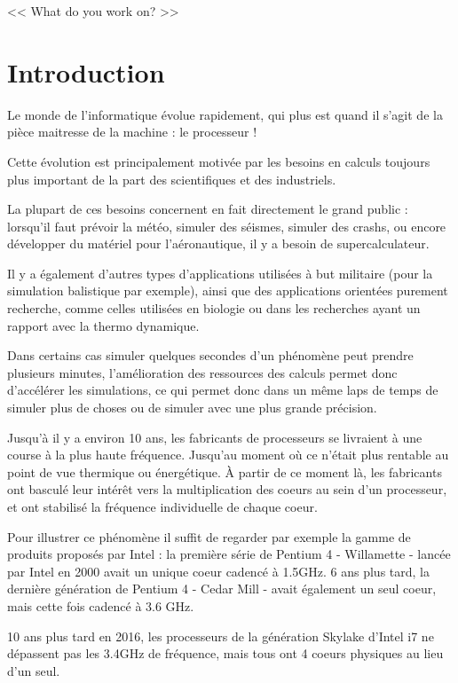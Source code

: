 \begin{savequote}[6cm]
<< What do you work on?  >>
\end{savequote}
\chapter{Introduction}
\chaptertoc

Le monde de l'informatique évolue rapidement, qui plus est quand il s'agit de la pièce maitresse de la machine : le processeur !

Cette évolution est principalement motivée par les besoins en calculs toujours plus important de la part des scientifiques et des industriels.

La plupart de ces besoins concernent en fait directement le grand public : lorsqu'il faut prévoir la météo, simuler des séismes, simuler des crashs, ou encore développer du matériel pour l'aéronautique, il y a besoin de supercalculateur.

Il y a également d'autres types d'applications utilisées à but militaire (pour la simulation balistique par exemple), ainsi que des applications orientées purement recherche, comme celles utilisées en biologie ou dans les recherches ayant un rapport avec la thermo dynamique.

Dans certains cas simuler quelques secondes d'un phénomène peut prendre plusieurs minutes, l'amélioration des ressources des calculs permet donc d'accélérer les simulations, ce qui permet donc dans un même laps de temps de simuler plus de choses ou de simuler avec une plus grande précision.

Jusqu'à il y a environ 10 ans, les fabricants de processeurs se livraient à une course à la plus haute fréquence.
Jusqu'au moment où ce n'était plus rentable au point de vue thermique ou énergétique. À partir de ce moment là, les fabricants ont basculé leur intérêt vers la multiplication des coeurs au sein d'un processeur, et ont stabilisé la fréquence individuelle de chaque coeur.

Pour illustrer ce phénomène il suffit de regarder par exemple la gamme de produits proposés par Intel : la première série de Pentium 4 - Willamette - lancée par Intel en 2000 avait un unique coeur cadencé à 1.5GHz. 6 ans plus tard, la dernière génération de Pentium 4 - Cedar Mill - avait également un seul coeur, mais cette fois cadencé à 3.6 GHz.

10 ans plus tard en 2016, les processeurs de la génération Skylake d'Intel i7 ne dépassent pas les 3.4GHz de fréquence, mais tous ont 4 coeurs physiques au lieu d'un seul.

